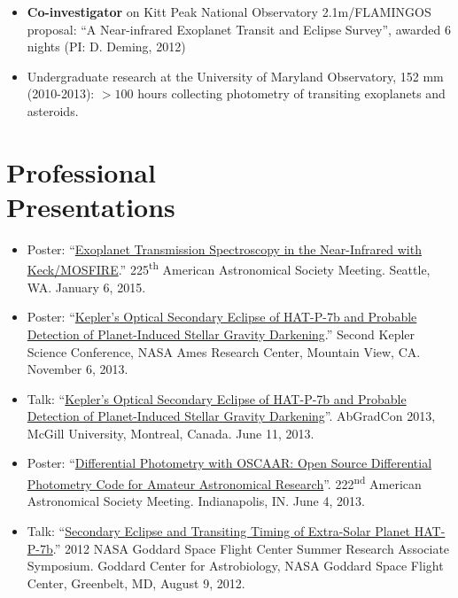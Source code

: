 \documentclass[margin]{res}
\begin{document}
\begin{resume}
\begin{itemize}
\item {\bf Co-investigator} on Kitt Peak National Observatory 2.1m/FLAMINGOS proposal: ``A Near-infrared Exoplanet Transit and Eclipse Survey'', awarded 6 nights (PI: D. Deming, 2012)

\item Undergraduate research at the University of Maryland Observatory, 152 mm (2010-2013): $>100$ hours collecting photometry of transiting exoplanets and asteroids. \\
\end{itemize}



\section{Professional\\ Presentations} 
\begin{itemize}  %

\item Poster: ``\href{http://adsabs.harvard.edu/abs/2015AAS...22525710M}{Exoplanet Transmission Spectroscopy in the Near-Infrared with Keck/MOSFIRE}.'' 225\textsuperscript{th} American Astronomical Society Meeting. Seattle, WA. January 6, 2015.

\item Poster: ``\href{http://nexsci.caltech.edu/conferences/KeplerII/posters/morris.pdf}{Kepler's Optical Secondary Eclipse of HAT-P-7b and Probable Detection of Planet-Induced Stellar Gravity Darkening}.'' Second Kepler Science Conference, NASA Ames Research Center, Mountain View, CA. November 6, 2013. 

\item Talk: ``\href{http://youtu.be/ZMfbkCzzQUE}{Kepler's Optical Secondary Eclipse of HAT-P-7b and Probable Detection of Planet-Induced Stellar Gravity Darkening}''. AbGradCon 2013, McGill University, Montreal, Canada. June 11, 2013.

\item Poster: ``\href{http://adsabs.harvard.edu/abs/2013AAS...22221717M}{Differential Photometry with OSCAAR: Open Source Differential Photometry Code for Amateur Astronomical Research}''. 222\textsuperscript{nd} American Astronomical Society Meeting. Indianapolis, IN. June 4, 2013.

\item Talk: ``\href{https://astrobiology.nasa.gov/seminars/featured-seminar-channels/gsfc-summer-internship/2012/08/09/gsfc-summer-research-associate-presentations/}{Secondary Eclipse and Transiting Timing of Extra-Solar Planet HAT-P-7b}.'' 2012 NASA Goddard Space Flight Center Summer Research Associate Symposium. Goddard Center for Astrobiology, NASA Goddard Space Flight Center, Greenbelt, MD, August 9, 2012.


\end{itemize}
\end{resume}
\end{document}
